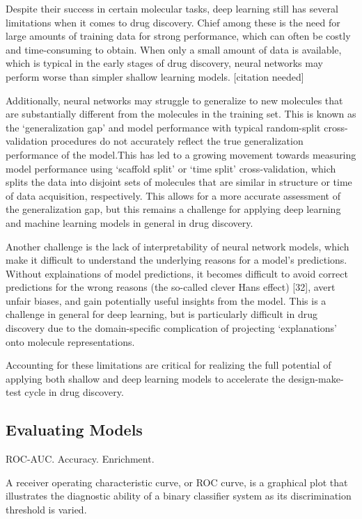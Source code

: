 Despite their success in certain molecular tasks, deep learning still has several limitations when it comes to drug discovery. Chief among these is the need for large amounts of training data for strong performance, which can often be costly and time-consuming to obtain. When only a small amount of data is available, which is typical in the early stages of drug discovery, neural networks may perform worse than simpler shallow learning models. [citation needed]

Additionally, neural networks may struggle to generalize to new molecules that are substantially different from the molecules in the training set. This is known as the `generalization gap' and model performance with typical random-split cross-validation procedures do not accurately reflect the true generalization performance of the model.This has led to a growing movement towards measuring model performance using `scaffold split' or `time split' cross-validation, which splits the data into disjoint sets of molecules that are similar in structure or time of data acquisition, respectively. This allows for a more accurate assessment of the generalization gap, but this remains a 
challenge for applying deep learning and machine learning models in general in drug discovery.

Another challenge is the lack of interpretability of neural network models, which make it difficult to understand the underlying reasons for a model's predictions. Without explainations of model predictions, it becomes difficult to avoid correct predictions for the wrong reasons (the so-called clever Hans effect) [32], avert unfair biases, and gain potentially useful insights from the model. This is a challenge in general for deep learning, but is particularly difficult in drug discovery due to the domain-specific complication of projecting `explanations' onto molecule representations.  

Accounting for these limitations are critical for realizing the full potential of applying both shallow and deep learning models to accelerate the design-make-test cycle in drug discovery.

\subsection{Evaluating Models}

ROC-AUC. Accuracy. Enrichment.

A receiver operating characteristic curve, or ROC curve, is a graphical plot that illustrates the diagnostic ability of a binary classifier system as its discrimination threshold is varied.

